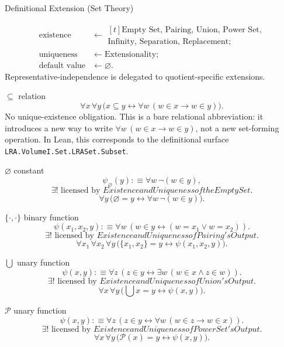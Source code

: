 \begin{modelbox}{Definitional Extension (Set Theory)}

\begin{modeldeltablock}
\begin{align*}
  \text{existence} &\leftarrow
  \begin{gathered}[t]
    \text{Empty Set, Pairing, Union, Power Set,}\\
    \text{Infinity, Separation, Replacement};
  \end{gathered}\\
  \text{uniqueness} &\leftarrow \text{Extensionality};\\
  \text{default value} &\leftarrow \varnothing.
\end{align*}
Representative-independence is delegated to quotient-specific extensions.
\end{modeldeltablock}

\begin{modelinstancesblock}
\textbf{\(\subseteq\)} relation
\[
\forall x\,\forall y\,
\bigl(x\subseteq y\leftrightarrow
  \forall w\,(w\in x\to w\in y)\bigr).
\]
No unique-existence obligation.
This is a bare relational abbreviation: it introduces a new way to write
\(\forall w\,(w\in x\to w\in y)\), not a new set-forming operation. In Lean,
this corresponds to the definitional surface
\texttt{LRA.VolumeI.Set.LRASet.Subset}.

\textbf{\(\varnothing\)} constant
\[
\psi_{\varnothing}(y):\equiv \forall w\,\neg(w\in y),
\]
\[
\exists!\text{ licensed by }
\hyperref[thm:empty-set-exists-unique]{Existence and Uniqueness of the Empty Set}.
\]
\[
\forall y\,
\bigl(\varnothing=y\leftrightarrow \forall w\,\neg(w\in y)\bigr).
\]

\textbf{\(\{\cdot,\cdot\}\)} binary function
\[
\psi(x_1,x_2,y):\equiv
\forall w\,(w\in y\leftrightarrow (w=x_1\vee w=x_2)).
\]
\[
\exists!\text{ licensed by }
\hyperref[thm:pairing-output-exists-unique]{Existence and Uniqueness of Pairing's Output}.
\]
\[
\forall x_1\,\forall x_2\,\forall y\,
\bigl(\{x_1,x_2\}=y\leftrightarrow\psi(x_1,x_2,y)\bigr).
\]

\textbf{\(\bigcup\)} unary function
\[
\psi(x,y):\equiv
\forall z\,(z\in y\leftrightarrow\exists w\,(w\in x\wedge z\in w)).
\]
\[
\exists!\text{ licensed by }
\hyperref[thm:union-output-exists-unique]{Existence and Uniqueness of Union's Output}.
\]
\[
\forall x\,\forall y\,
\bigl(\textstyle\bigcup x=y\leftrightarrow\psi(x,y)\bigr).
\]

\textbf{\(\mathcal P\)} unary function
\[
\psi(x,y):\equiv
\forall z\,(z\in y\leftrightarrow\forall w\,(w\in z\to w\in x)).
\]
\[
\exists!\text{ licensed by }
\hyperref[thm:power-set-output-exists-unique]{Existence and Uniqueness of Power Set's Output}.
\]
\[
\forall x\,\forall y\,
\bigl(\mathcal P(x)=y\leftrightarrow\psi(x,y)\bigr).
\]
\end{modelinstancesblock}
\end{modelbox}
